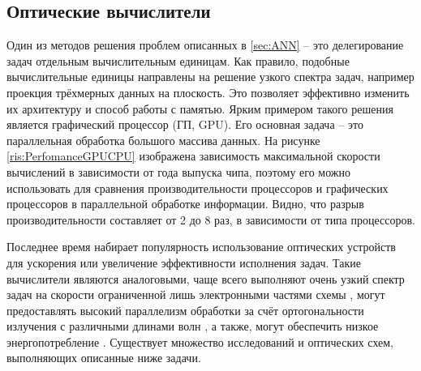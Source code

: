 \subsection{Оптические вычислители}\label{sec:OpticalCalcs}
Один из методов решения проблем описанных в \ref{sec:ANN} -- это делегирование задач отдельным вычислительным единицам. Как правило, подобные вычислительные единицы направлены на решение узкого спектра задач, например проекция трёхмерных данных на плоскость. Это позволяет эффективно изменить их архитектуру и способ работы с памятью. Ярким примером такого решения является графический процессор (ГП, GPU). Его основная задача -- это параллельная обработка большого массива данных. На рисунке \ref{ris:PerfomanceGPUCPU} изображена зависимость максимальной скорости вычислений в зависимости от года выпуска чипа, поэтому его можно использовать для сравнения производительности процессоров и графических процессоров в параллельной обработке информации. Видно, что разрыв производительности составляет от 2 до 8 раз, в зависимости от типа процессоров.
\par
Последнее время набирает популярность использование оптических устройств для ускорения или увеличение эффективности исполнения задач. Такие вычислители являются аналоговыми, чаще всего выполняют очень узкий спектр задач на скорости ограниченной лишь электронными частями схемы \cite{solli2015analog}, могут предоставлять высокий параллелизм обработки за счёт ортогональности излучения с различными длинами волн \cite{mcmahon2023physics}, а также, могут обеспечить низкое энергопотребление \cite{wu2022analog}. Существует множество исследований и оптических схем, выполняющих описанные ниже задачи.





